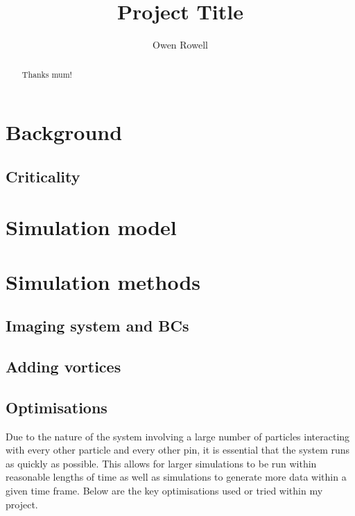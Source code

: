 \documentclass[a4paper, twoside]{article}
\title{Project Title}
\author{Owen Rowell}
\numberwithin{equation}{section}
\begin{document}


\renewcommand{\abstractname}{Acknowledgements}
\begin{abstract}
Thanks mum!
\end{abstract}

\newpage
\tableofcontents
\listoffigures
\listoftables
\listoftodos
\newpage

\section{Background}
\subsection{Criticality}
\section{Simulation model}
\section{Simulation methods}
\subsection{Imaging system and BCs}
\subsection{Adding vortices}

\subsection{Optimisations}
Due to the nature of the system involving a large number of particles interacting with every other particle and every other pin, it is essential that the system runs as quickly as possible. This allows for larger simulations to be run within reasonable lengths of time as well as simulations to generate more data within a given time frame. Below are the key optimisations used or tried within my project.
\end{document}
